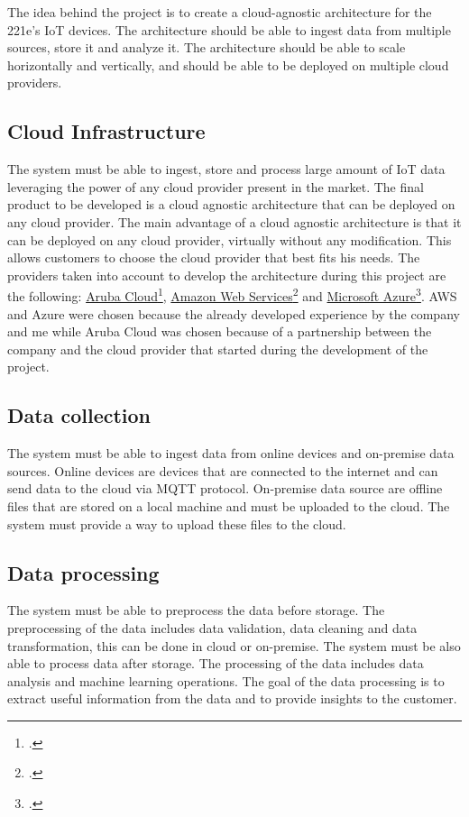 The idea behind the project is to create a cloud-agnostic architecture for the 221e's IoT devices. The architecture should be able to ingest data from multiple sources, store it and  analyze it. The architecture should be able to scale horizontally and vertically, and should be able to be deployed on multiple cloud providers.

\subsection{Cloud Infrastructure}
The system must be able to ingest, store and process large amount of IoT data leveraging the power of any cloud provider present in the market. The final product to be developed is a cloud agnostic architecture that can be deployed on any cloud provider. The main advantage of a cloud agnostic architecture is that it can be deployed on any cloud provider, virtually without any modification. This allows customers to choose the cloud provider that best fits his needs.
The providers taken into account to develop the architecture during this project are the following: \href{https://www.arubacloud.com/}{Aruba Cloud}\footcite{site:aruba-cloud}, \href{https://aws.amazon.com/it/}{Amazon Web Services}\footcite{site:aws} and \href{https://azure.microsoft.com/it-it/}{Microsoft Azure}\footcite{site:azure}. 
AWS and Azure were chosen because the already developed experience by the company and me while Aruba Cloud was chosen because of a partnership between the company and the cloud provider that started during the development of the project.\\


\subsection{Data collection}
The system must be able to ingest data from online devices and on-premise data sources. 
Online devices are devices that are connected to the internet and can send data to the cloud via MQTT protocol.
On-premise data source are offline files that are stored on a local machine and must be uploaded to the cloud. The system must provide a way to upload these files to the cloud.
\subsection{Data processing}
The system must be able to preprocess the data before storage. The preprocessing of the data includes data validation, data cleaning and data transformation, this can be done in cloud or on-premise. The system must be also able to process data after storage. The processing of the data includes data analysis and machine learning operations. The goal of the data processing is to extract useful information from the data and to provide insights to the customer.\\ 


